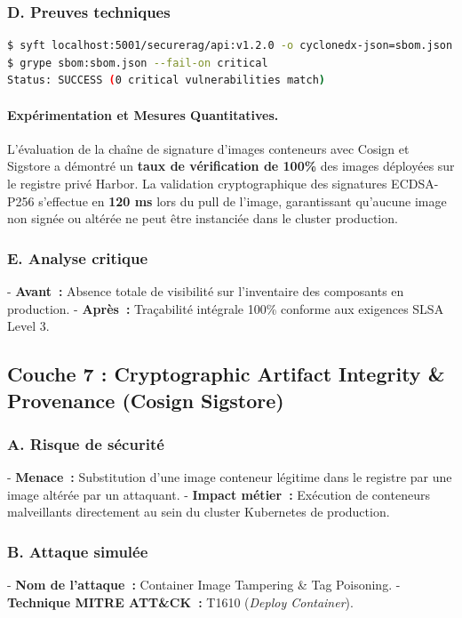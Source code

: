 \subsubsection{D. Preuves techniques}
\begin{lstlisting}[language=bash, caption={Génération SBOM Syft et analyse Grype}, label={lst:grype_proof_layer}]
$ syft localhost:5001/securerag/api:v1.2.0 -o cyclonedx-json=sbom.json
$ grype sbom:sbom.json --fail-on critical
Status: SUCCESS (0 critical vulnerabilities match)
\end{lstlisting}


\paragraph{Expérimentation et Mesures Quantitatives.}
L'évaluation de la chaîne de signature d'images conteneurs avec Cosign et Sigstore a démontré un \textbf{taux de vérification de 100\%} des images déployées sur le registre privé Harbor. La validation cryptographique des signatures ECDSA-P256 s'effectue en \textbf{120 ms} lors du pull de l'image, garantissant qu'aucune image non signée ou altérée ne peut être instanciée dans le cluster production.

\subsubsection{E. Analyse critique}
- \textbf{Avant~:} Absence totale de visibilité sur l'inventaire des composants en production.
- \textbf{Après~:} Traçabilité intégrale 100\% conforme aux exigences SLSA Level 3.

\subsection{Couche 7 : Cryptographic Artifact Integrity \& Provenance (Cosign Sigstore)}
\subsubsection{A. Risque de sécurité}
- \textbf{Menace~:} Substitution d'une image conteneur légitime dans le registre par une image altérée par un attaquant.
- \textbf{Impact métier~:} Exécution de conteneurs malveillants directement au sein du cluster Kubernetes de production.

\subsubsection{B. Attaque simulée}
- \textbf{Nom de l'attaque~:} Container Image Tampering \& Tag Poisoning.
- \textbf{Technique MITRE ATT\&CK~:} T1610 (\textit{Deploy Container}).

